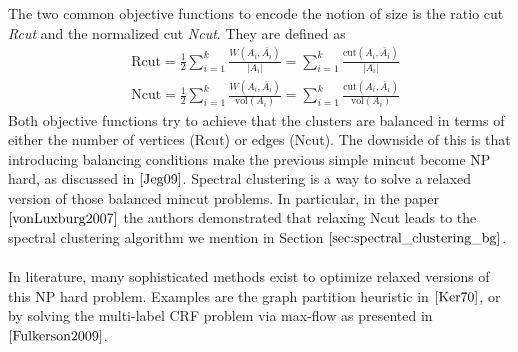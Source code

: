 The two common objective functions to encode the notion of size is the ratio cut \textit{Rcut} and the normalized cut \textit{Ncut}. They are defined as
\begin{equation}
\begin{aligned}
&\text{Rcut} = \frac{1}{2} \sum_{i=1}^k \frac{W(A_i, \bar{A_i})}{\left| A_i\right|} = \sum_{i=1}^k \frac{\text{cut}(A_i, \bar{A_i})}{\left| A_i\right|} \\
&\text{Ncut} = \frac{1}{2} \sum_{i=1}^k \frac{W(A_i, \bar{A_i})}{\text{vol}(A_i)} = \sum_{i=1}^k \frac{\text{cut}(A_i, \bar{A_i})}{\text{vol}(A_i)}
\end{aligned}
\end{equation}
Both objective functions try to achieve that the clusters are balanced in terms of either the number of vertices (Rcut) or edges (Ncut). The downside of this is that introducing balancing conditions make the previous simple mincut become NP hard, as discussed in $\cite{Jeg09}$. Spectral clustering is a way to solve a relaxed version of those balanced mincut problems. In particular, in the paper $\cite{vonLuxburg2007}$ the authors demonstrated that relaxing Ncut leads to the spectral clustering algorithm we mention in Section $\ref{sec:spectral_clustering_bg}$. \\ \\
In literature, many sophisticated methods exist to optimize relaxed versions of this NP hard problem. Examples are the graph partition heuristic in $\cite{Ker70}$, or by solving the multi-label CRF problem via max-flow as presented in $\cite{Fulkerson2009}$.

